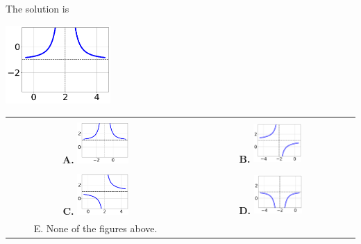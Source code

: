 \documentclass{extbook}[14pt]
\begin{document}
 
 The solution is  
 \begin{center} \includegraphics[width=0.3\textwidth]{../Figures/rationalEquationToGraphEC.png} \end{center}\begin{tabular}{|c|c|} 
\hline 
 & \tabularnewline 
 \textbf{A.} \includegraphics[width=0.3\textwidth]{../Figures/rationalEquationToGraphAC.png} & \textbf{B.} \includegraphics[width=0.3\textwidth]{../Figures/rationalEquationToGraphBC.png} \tabularnewline 
\hline 
 & \tabularnewline 
 \textbf{C.} \includegraphics[width=0.3\textwidth]{../Figures/rationalEquationToGraphCC.png} & \textbf{D.} \includegraphics[width=0.3\textwidth]{../Figures/rationalEquationToGraphDC.png} \tabularnewline 
\hline 
 E. None of the figures above. & \tabularnewline 
\hline 
 \end{tabular} 
 
\end{document}
